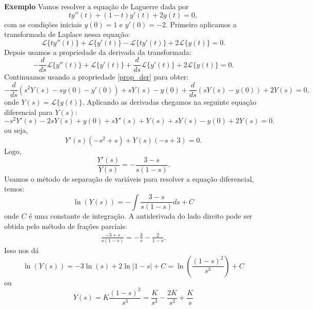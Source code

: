 \documentclass[a4paper,10pt]{book}
\begin{document}
{\bf Exemplo} Vamos resolver a equação de Laguerre dada por
 \begin{equation}
 ty''(t)+(1-t)y'(t)+2y(t)=0,
 \end{equation}
 com as condições iniciais $y(0)=1$ e $y'(0)=-2$. Primeiro aplicamos a transformada de Laplace nessa equação:
 \begin{equation}
 \mathcal{L}\{ty''(t)\}+\mathcal{L}\{y'(t)\}-\mathcal{L}\{ty'(t)\}+2\mathcal{L}\{y(t)\}=0.
 \end{equation}
 Depois usamos a propriedade da derivada da transformada:
 \begin{equation}
 -\frac{d}{ds}\mathcal{L}\{y''(t)\}+\mathcal{L}\{y'(t)\}+\frac{d}{ds}\mathcal{L}\{y'(t)\}+2\mathcal{L}\{y(t)\}=0.
 \end{equation}
Continuamos usando a propriedade \ref{prop_der} para obter:
 \begin{equation}
 -\frac{d}{ds}\left(s^2Y(s)-sy(0)-y'(0)\right)+sY(s)-y(0)+\frac{d}{ds}\left(sY(s)-y(0)\right)+2Y(s)=0,
 \end{equation}
 onde $Y(s)=\mathcal{L}\{y(t)\}$. Aplicando as derivadas chegamos na seguinte equação diferencial para $Y(s)$:
 \begin{equation}
 -s^2Y'(s)-2sY(s)+y(0)+sY'(s)+Y(s)+sY(s)-y(0)+2Y(s)=0.
 \end{equation}
 ou seja,
 \begin{equation}
 Y'(s)\left(-s^2+s\right)+Y(s)\left(-s+3\right)=0.
 \end{equation}
 Logo,
 \begin{equation}
 \frac{Y'(s)}{Y(s)}=-\frac{3-s}{s(1-s)}.
 \end{equation}
 Usamos o método de separação de variáveis para resolver a equação diferencial, temos:
 \begin{equation}
 \ln(Y(s))=-\int \frac{3-s}{s(1-s)} ds +C
 \end{equation}
 onde $C$ é uma constante de integração. A antiderivada do lado direito pode ser obtida pelo método de frações parciais:
 \begin{eqnarray*}
 \frac{-3+s}{s(1-s)}=-\frac{3}{s}-\frac{2}{1-s}.
 \end{eqnarray*}
 Isso nos dá
 \begin{equation}
 \ln(Y(s))=-3\ln(s)+2\ln|1-s|+C=\ln\left(\frac{(1-s)^2}{s^3} \right)+C
 \end{equation}
 ou
 \begin{equation}
 Y(s)=K\frac{(1-s)^2}{s^3}=\frac{K}{s^3}-\frac{2K}{s^2}+\frac{K}{s}
 \end{equation}
\end{document}
